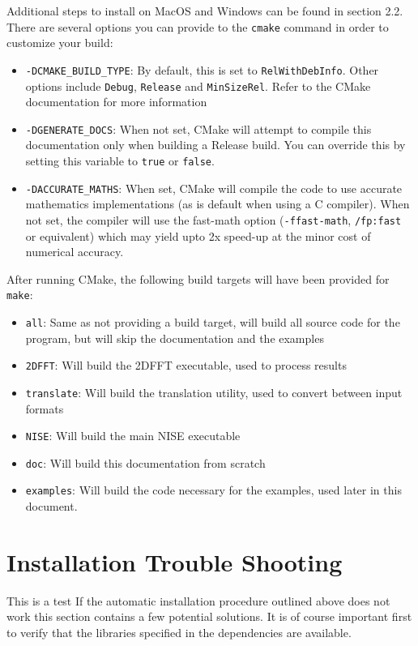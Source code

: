 \documentclass[12pt]{book}
\begin{document}
\noindent
Additional steps to install on MacOS and Windows can be found in section 2.2.\\

There are several options you can provide to the {\tt cmake} command in order to customize your build:
\begin{itemize}
\item {\tt -DCMAKE\_BUILD\_TYPE}: By default, this is set to {\tt RelWithDebInfo}. Other options include {\tt Debug}, {\tt Release} and {\tt MinSizeRel}. Refer to the CMake documentation for more information
\item {\tt -DGENERATE\_DOCS}: When not set, CMake will attempt to compile this documentation only when building a Release build. You can override this by setting this variable to {\tt true} or {\tt false}.
\item {\tt -DACCURATE\_MATHS}: When set, CMake will compile the code to use accurate mathematics implementations (as is default when using a C compiler). When not set, the compiler will use the fast-math option ({\tt -ffast-math}, {\tt /fp:fast} or equivalent) which may yield upto 2x speed-up at the minor cost of numerical accuracy.
\end{itemize}

After running CMake, the following build targets will have been provided for {\tt make}:
\begin{itemize}
\item {\tt all}: Same as not providing a build target, will build all source code for the program, but will skip the documentation and the examples
\item {\tt 2DFFT}: Will build the 2DFFT executable, used to process results
\item {\tt translate}: Will build the translation utility, used to convert between input formats
\item {\tt NISE}: Will build the main NISE executable
\item {\tt doc}: Will build this documentation from scratch
\item {\tt examples}: Will build the code necessary for the examples, used later in this document.
\end{itemize}

\section{Installation Trouble Shooting}
This is a test
If the automatic installation procedure outlined above does not work this section contains a few potential solutions. It is of course important first to verify that the libraries specified in the dependencies are available.
\end{document}
